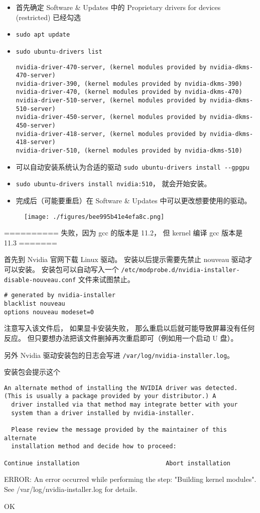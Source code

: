 \begin{itemize}
\item 首先确定 Software & Updates 中的 Proprietary drivers for devices (restricted) 已经勾选
\item \verb`sudo apt update`
\item \verb`sudo ubuntu-drivers list`
\begin{lstlisting}[language=none]
nvidia-driver-470-server, (kernel modules provided by nvidia-dkms-470-server)
nvidia-driver-390, (kernel modules provided by nvidia-dkms-390)
nvidia-driver-470, (kernel modules provided by nvidia-dkms-470)
nvidia-driver-510-server, (kernel modules provided by nvidia-dkms-510-server)
nvidia-driver-450-server, (kernel modules provided by nvidia-dkms-450-server)
nvidia-driver-418-server, (kernel modules provided by nvidia-dkms-418-server)
nvidia-driver-510, (kernel modules provided by nvidia-dkms-510)
\end{lstlisting}
\item 可以自动安装系统认为合适的驱动 \verb`sudo ubuntu-drivers install --gpgpu`
\item \verb`sudo ubuntu-drivers install nvidia:510`， 就会开始安装。
\item 完成后（可能要重启）在 Software & Updates 中可以更改想要使用的驱动。
\end{itemize}
\begin{figure}[ht]
\centering
\texttt{[image: ./figures/bee995b41e4efa8c.png]}
\caption{} \label{fig_NvDrUb_1}
\end{figure}




========== 失败，因为 gcc 的版本是 11.2， 但 kernel 编译 gcc 版本是 11.3 =======

首先到 Nvidia 官网下载 Linux 驱动。 安装以后提示需要先禁止 nouveau 驱动才可以安装。 安装包可以自动写入一个 \verb`/etc/modprobe.d/nvidia-installer-disable-nouveau.conf` 文件来试图禁止。
\begin{lstlisting}[language=none,caption=nvidia-installer-disable-nouveau.conf]
# generated by nvidia-installer
blacklist nouveau
options nouveau modeset=0
\end{lstlisting}

注意写入该文件后， 如果显卡安装失败， 那么重启以后就可能导致屏幕没有任何反应。 但只要想办法把该文件删掉再次重启即可（例如用一个启动 U 盘）。

另外 Nvidia 驱动安装包的日志会写进 \verb`/var/log/nvidia-installer.log`。

安装包会提示这个
\begin{lstlisting}[language=none]
An alternate method of installing the NVIDIA driver was detected.
(This is usually a package provided by your distributor.) A      
  driver installed via that method may integrate better with your
  system than a driver installed by nvidia-installer.

  Please review the message provided by the maintainer of this alternate
  installation method and decide how to proceed:

Continue installation                        Abort installation 
\end{lstlisting}

ERROR: An error occurred while performing the step: "Building kernel modules". See /var/log/nvidia-installer.log for details.      
        
                                                                  OK 

